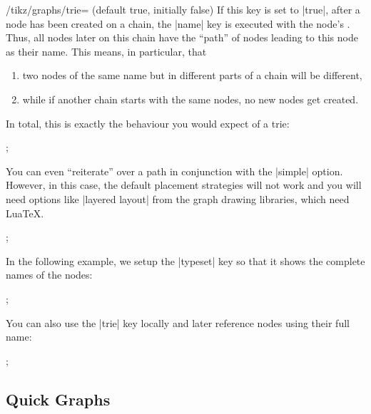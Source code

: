 \begin{key}{/tikz/graphs/trie= (default true, initially false)}
    If this key is set to |true|, after a node has been created on a chain, the
    |name| key is executed with the node's . Thus, all nodes
    later on this chain have the ``path'' of nodes leading to this node as
    their name. This means, in particular, that
    \begin{enumerate}
        \item two nodes of the same name but in different parts of a chain will
            be different,
        \item while if another chain starts with the same nodes, no new nodes
            get created.
    \end{enumerate}
    In total, this is exactly the behaviour you would expect of a trie:
\begin{codeexample}[]
\tikz {};
\end{codeexample}
    You can even ``reiterate'' over a path in conjunction with the |simple|
    option. However, in this case, the default placement strategies will not
    work and you will need options like |layered layout| from the graph drawing
    libraries, which need Lua\TeX.
\ifluatex
\begin{codeexample}[]
\tikz {};
\end{codeexample}
    In the following example, we setup the |typeset| key so that it shows the
    complete names of the nodes:
\begin{codeexample}[]
\tikz {};
\end{codeexample}
\fi
    You can also use the |trie| key locally and later reference nodes using
    their full name:
\begin{codeexample}[]
\tikz {};
\end{codeexample}
\end{key}


\subsection{Quick Graphs}
\label{section-library-graphs-quick}

